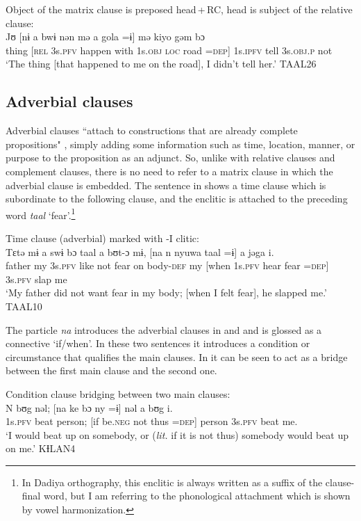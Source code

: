 \documentclass[output=paper]{langscibook}
\begin{document}
\ea Object of the matrix clause is preposed head\,+\,RC, head is subject of the relative clause:
\label{ex:dettweiler:TAAL26} \\
\gll Jʊ [nɨ a bwɨ nən mə a gola =ɨ] mə kiyo gəm bɔ \\
thing [\textsc{rel} 3s.\textsc{pfv} happen with 1s.\textsc{obj} \textsc{loc} road =\textsc{dep}] 1s.\textsc{ipfv} tell 3s.\textsc{obj}.\textsc{p} not \\
\glt `The thing [that happened to me on the road], I didn't tell her.' TAAL26
\z

\subsection{Adverbial clauses}

Adverbial clauses ``attach to constructions that are already complete propositions" \citep[317]{Payne1997}, simply adding some information such as time, location, manner, or purpose to the proposition as an adjunct. So, unlike with relative clauses and complement clauses, there is no need to refer to a matrix clause in which the adverbial clause is embedded. The sentence in  shows a time clause which is subordinate to the following clause, and the enclitic is attached to the preceding word \textit{taal} `fear'.\footnote{In Dadiya orthography, this enclitic is always written as a suffix of the clause-final word, but I am referring to the phonological attachment which is shown by vowel harmonization.}

\ea Time clause (adverbial) marked with -I clitic:
\label{ex:dettweiler:TAAL10} \\
\gll Tɛtə mɨ a swɨ bɔ taal a bʊt-ɔ mɨ, [na n nyuwa taal =ɨ] a jəga i. \\
father my 3s.\textsc{pfv} like not fear on body-\textsc{def} my [when 1s.\textsc{pfv} hear fear =\textsc{dep}] 3s.\textsc{pfv} slap me \\
\glt `My father did not want fear in my body; [when I felt fear], he slapped me.' TAAL10
\z

\noindent The particle \textit{na} introduces the adverbial clauses in  and  and is glossed as a connective `if/when'. In these two sentences it introduces a condition or circumstance that qualifies the main clauses. In  it can be seen to act as a bridge between the first main clause and the second one.

\ea Condition clause bridging between two main clauses:
\label{ex:dettweiler:KƗLAN4} \\
\gll N bʊg nəl; [na ke bɔ ny =ɨ] nəl a bʊg i. \\
1s.\textsc{pfv} beat person; [if be.\textsc{neg} not thus =\textsc{dep}] person 3s.\textsc{pfv} beat me. \\
\glt `I would beat up on somebody, or (\textit{lit.} if it is not thus) somebody would beat up on me.' KƗLAN4
\z
\end{document}
